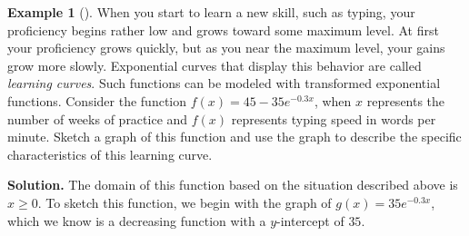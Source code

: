 \documentclass[10pt,]{book}
\theoremstyle{plain}
\theoremstyle{definition}
\theoremstyle{definition}
\newtheorem{example}[theorem]{Example}
\theoremstyle{definition}
\numberwithin{equation}{section}
\begin{document}
\begin{example}[]\label{example-18}
\hypertarget{p-245}{}%
When you start to learn a new skill, such as typing, your proficiency begins rather low and grows toward some maximum level.  At first your proficiency grows quickly, but as you near the maximum level, your gains grow more slowly.  Exponential curves that display this behavior are called \emph{learning curves}. Such functions can be modeled with transformed exponential functions. Consider the function \(f(x) = 45 - 35e^{-0.3x}\), when \(x\) represents the number of weeks of practice and \(f(x)\) represents typing speed in words per minute.  Sketch a graph of this function and use the graph to describe the specific characteristics of this learning curve.%
\par\smallskip%
\noindent\textbf{Solution.}\hypertarget{solution-18}{}\quad%
\hypertarget{p-246}{}%
The domain of this function based on the situation described above is \(x \geq 0\).  To sketch this function, we begin with the graph of \(g(x)= 35e^{-0.3x}\), which we know is a decreasing function with a \(y\)-intercept of \(35\).%
\begin{figure}
\centering
{
}
\end{figure}
\end{example}
\end{document}

